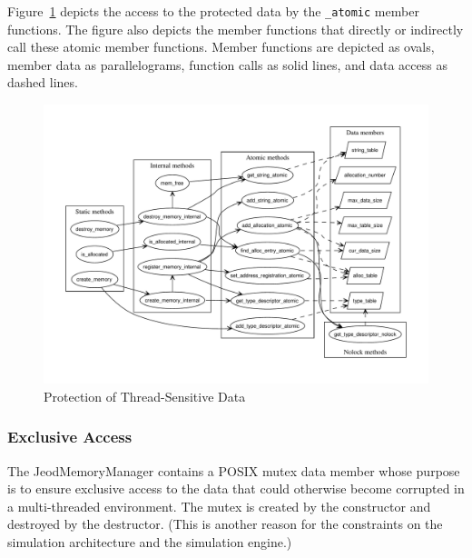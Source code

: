 Figure~\ref{fig:protected_data_access} depicts the access to the protected data by the \verb|_atomic| member functions. The figure also depicts the
member functions that directly or indirectly call these atomic member functions.
Member functions are depicted as ovals,
member data as parallelograms,
function calls as solid lines, and
data access as dashed lines.

\begin{figure}[hbtp]
\centering
\includegraphics[width=6.5in]{atomic_methods}
\caption{Protection of Thread-Sensitive Data}
\label{fig:protected_data_access}
\end{figure}

\subsubsection{Exclusive Access}\label{sec:exclusive_access}
The JeodMemoryManager contains a POSIX mutex data member whose purpose is to
ensure exclusive access to the data that could otherwise become corrupted in a
multi-threaded environment. The mutex is created by the constructor and
destroyed by the destructor. (This is another reason for the constraints on the
simulation architecture and the simulation engine.)


